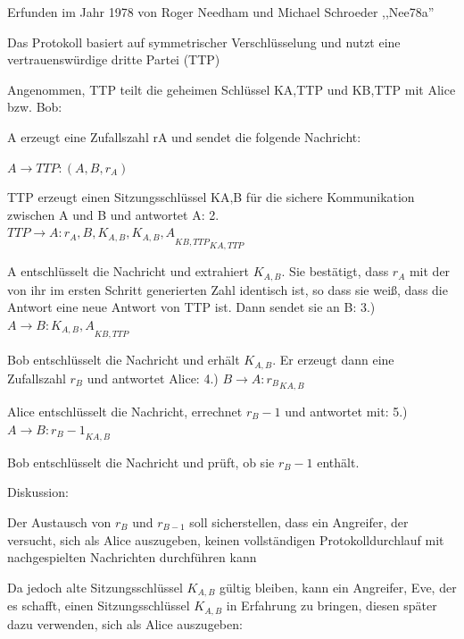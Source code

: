 \documentclass[a4paper]{article}
\begin{document}
\begin{multicols}{3}
      \begin{itemize*}
            \item Erfunden im Jahr 1978 von Roger Needham und Michael Schroeder
            ,,Nee78a''
            \item Das Protokoll basiert auf symmetrischer Verschlüsselung und nutzt eine
            vertrauenswürdige dritte Partei (TTP)
            \item Angenommen, TTP teilt die geheimen Schlüssel KA,TTP und KB,TTP mit
            Alice bzw. Bob:
            \begin{itemize*}
                  \item A erzeugt eine Zufallszahl rA und sendet die folgende Nachricht:
                  \begin{enumerate*} \def\labelenumi{\arabic{enumi}.} \item $A\rightarrow TTP: (A, B, r_A)$ \end{enumerate*}
                  \item TTP erzeugt einen Sitzungsschlüssel KA,B für die sichere Kommunikation zwischen A und B und antwortet A: 2. $TTP\rightarrow A:{r_A, B, K_{A,B}, {K_{A,B}, A}_{{K}{B,TTP}}}_{{K}{A,TTP}}$
                  \item A entschlüsselt die Nachricht und extrahiert $K_{A,B}$. Sie bestätigt, dass $r_A$ mit der von ihr im ersten Schritt generierten Zahl identisch ist, so dass sie weiß, dass die Antwort eine neue Antwort von TTP ist. Dann sendet sie an B: 3.) $A\rightarrow B:{K_{A,B}, A}_{{K}{B,TTP}}$
                  \item Bob entschlüsselt die Nachricht und erhält $K_{A,B}$. Er erzeugt dann eine Zufallszahl $r_B$ und antwortet Alice: 4.) $B\rightarrow A:{r_B}_{{K}{A,B}}$
                  \item Alice entschlüsselt die Nachricht, errechnet $r_{B}-1$ und antwortet mit: 5.) $A\rightarrow B:{r_B-1}_{{K}{A,B}}$
                  \item Bob entschlüsselt die Nachricht und prüft, ob sie $r_B-1$ enthält.
            \end{itemize*}
            \item Diskussion:
            \begin{itemize*}
                  \item Der Austausch von $r_B$ und $r_{B-1}$ soll sicherstellen, dass ein Angreifer, der versucht, sich als Alice auszugeben, keinen vollständigen Protokolldurchlauf mit nachgespielten Nachrichten durchführen kann
                  \item Da jedoch alte Sitzungsschlüssel $K_{A,B}$ gültig bleiben, kann ein Angreifer, Eve, der es schafft, einen Sitzungsschlüssel $K_{A,B}$ in Erfahrung zu bringen, diesen später dazu verwenden, sich als Alice auszugeben:

\end{itemize*}
\end{itemize*}
\end{multicols}
\end{document}
